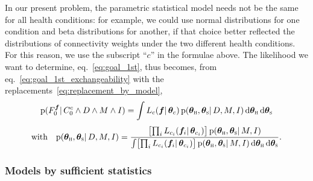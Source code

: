 \documentclass[%
]{frontiersSCNS-nologo} %
\newcommand*{\eqn}{eq.}
\newcommand*{\di}{\mathrm{d}}%
\newcommand*{\pf}{\mathrm{p}}%
\renewcommand*{\|}{\mathpunct{|}}%
\let\oldprod\prod
\renewcommand*{\prod}{\mathop{\textstyle\oldprod}}
\newcommand*{\yH}{C}
\newcommand*{\yh}{c}
\newcommand*{\yhu}{\textsc{h}}
\newcommand*{\yhd}{\textsc{s}}
\newcommand*{\yD}{D}
\newcommand*{\yF}{F}
\newcommand*{\yf}{\bm{f}}
\newcommand*{\yI}{I}
\newcommand*{\yM}{M}
\newcommand*{\yth}{\bm{\theta}}
\newcommand*{\ythh}{\yth_{\yhu}}
\newcommand*{\yths}{\yth_{\yhd}}
\newcommand*{\yL}{L}
\begin{document}
In our present problem, the parametric statistical model needs not be the
same for all health conditions: for example, we could use normal
distributions for one condition and beta distributions for another, if that choice better reflected the distributions of connectivity weights under the two
different health conditions. For this reason, we use the subscript
\enquote{$\yh$} in the formulae above. The likelihood we want to determine,
\eqn~\eqref{eq:goal_1st},
thus becomes, from \eqn~\eqref{eq:goal_1st_exchangeability} with the
replacements~\eqref{eq:replacement_by_model},
\begin{subequations}\label{eq:goal_1st_exchangeability_parametric}
  \begin{gather}
    \pf( \yF_0^{\yf}\| \yH_0^{\yh} \land \yD \land \yM \land \yI)
    = 
    \int \yL_{\yh}(\yf \| \yth_{\yh})\,
    \pf(\ythh,\yths \|\yD , \yM ,\yI) \,\di\ythh\,\di\yths
    \\[\jot]
    \text{with} \quad
    \pf(\ythh,\yths \|\yD ,\yM , \yI) 
    = \frac{\bigl[ \prod_i \yL_{\yh_i}(\yf_i \|\yth_{\yh_i}) \bigr]\,
      \pf(\ythh,\yths \|\yM , \yI)
    }{
      \int \bigl[ \prod_i \yL_{\yh_i}(\yf_i \| \yth_{\yh_i}) \bigr]\,
      \pf(\ythh, \yths \|\yM ,\yI) \,\di\ythh\,\di\yths}    
    .
    \label{eq:updated_hyperprior}
  \end{gather}
\end{subequations}



\subsubsection{Models by sufficient statistics}
\label{sec:suff_stat}
\end{document}
